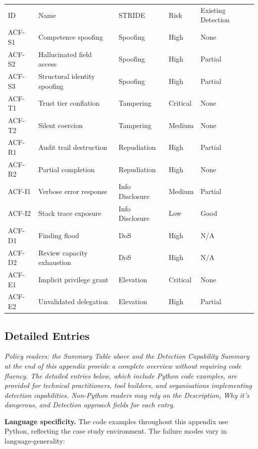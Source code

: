 \documentclass[a4paper,11pt]{report}
\renewcommand{\toprule}{\hline\noalign{\smallskip}}
\renewcommand{\midrule}{\noalign{\smallskip}\hline\noalign{\smallskip}}
\renewcommand{\bottomrule}{\noalign{\smallskip}\hline}
\begin{document}
\begin{longtable}[]{@{}lllll@{}}
\toprule\noalign{}
ID & Name & STRIDE & Risk & Existing Detection \\
\midrule\noalign{}
\endhead
\bottomrule\noalign{}
\endlastfoot
ACF-S1 & Competence spoofing & Spoofing & High & None \\
ACF-S2 & Hallucinated field access & Spoofing & High & Partial \\
ACF-S3 & Structural identity spoofing & Spoofing & High & Partial \\
ACF-T1 & Trust tier conflation & Tampering & Critical & None \\
ACF-T2 & Silent coercion & Tampering & Medium & None \\
ACF-R1 & Audit trail destruction & Repudiation & High & Partial \\
ACF-R2 & Partial completion & Repudiation & High & None \\
ACF-I1 & Verbose error response & Info Disclosure & Medium & Partial \\
ACF-I2 & Stack trace exposure & Info Disclosure & Low & Good \\
ACF-D1 & Finding flood & DoS & High & N/A \\
ACF-D2 & Review capacity exhaustion & DoS & High & N/A \\
ACF-E1 & Implicit privilege grant & Elevation & Critical & None \\
ACF-E2 & Unvalidated delegation & Elevation & High & Partial \\
\end{longtable}

\hypertarget{detailed-entries}{%
\subsection{Detailed Entries}\label{detailed-entries}}

\emph{Policy readers: the Summary Table above and the Detection
Capability Summary at the end of this appendix provide a complete
overview without requiring code fluency. The detailed entries below,
which include Python code examples, are provided for technical
practitioners, tool builders, and organisations implementing detection
capabilities. Non-Python readers may rely on the Description, Why it's
dangerous, and Detection approach fields for each entry.}

\textbf{Language specificity.} The code examples throughout this
appendix use Python, reflecting the case study environment. The failure
modes vary in language-generality:
\end{document}

